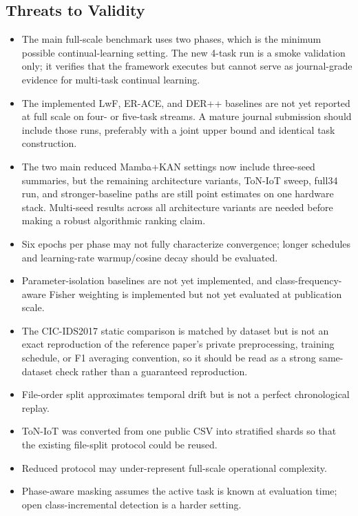 \documentclass[a4paper,fleqn]{cas-dc}
\begin{document}
\subsection{Threats to Validity}
\begin{itemize}
\item The main full-scale benchmark uses two phases, which is the minimum possible continual-learning setting. The new 4-task run is a smoke validation only; it verifies that the framework executes but cannot serve as journal-grade evidence for multi-task continual learning.
\item The implemented LwF, ER-ACE, and DER++ baselines are not yet reported at full scale on four- or five-task streams. A mature journal submission should include those runs, preferably with a joint upper bound and identical task construction.
\item The two main reduced Mamba+KAN settings now include three-seed summaries, but the remaining architecture variants, ToN-IoT sweep, full34 run, and stronger-baseline paths are still point estimates on one hardware stack. Multi-seed results across all architecture variants are needed before making a robust algorithmic ranking claim.
\item Six epochs per phase may not fully characterize convergence; longer schedules and learning-rate warmup/cosine decay should be evaluated.
\item Parameter-isolation baselines are not yet implemented, and class-frequency-aware Fisher weighting is implemented but not yet evaluated at publication scale.
\item The CIC-IDS2017 static comparison is matched by dataset but is not an exact reproduction of the reference paper's private preprocessing, training schedule, or F1 averaging convention, so it should be read as a strong same-dataset check rather than a guaranteed reproduction.
\item File-order split approximates temporal drift but is not a perfect chronological replay.
\item ToN-IoT was converted from one public CSV into stratified shards so that the existing file-split protocol could be reused.
\item Reduced protocol may under-represent full-scale operational complexity.
\item Phase-aware masking assumes the active task is known at evaluation time; open class-incremental detection is a harder setting.
\end{itemize}
\end{document}
